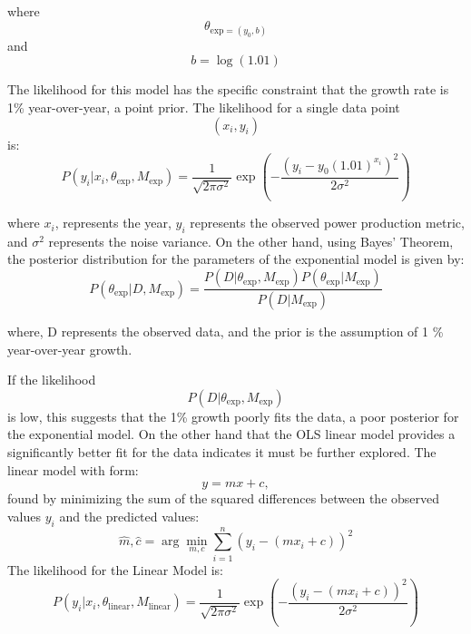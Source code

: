 \documentclass[final,5p,times,twocolumn,authoryear]{elsarticle}
\begin{document}
where $$\theta_{\text{exp}= (y_0,b)}$$ and $$ b= \log(1.01)$$

The likelihood for this model has the specific constraint that the growth rate is 1\% year-over-year, a point prior. The likelihood for a single data point $$(x_{i},y_{i})$$ is: $$P(y_i | x_i, \theta_{\text{exp}}, M_{\text{exp}}) = \frac{1}{\sqrt{2 \pi \sigma^2}} \exp \left( -\frac{(y_i - y_0 (1.01)^{x_i})^2}{2\sigma^2} \right)
$$

where $x_{i}$, represents the year, $y_{i}$ represents the observed power production metric, and $\sigma^{2}$ represents the noise variance. On the other hand, using Bayes' Theorem, the posterior distribution for the parameters of the exponential model is given by:
$$P(\theta_{\text{exp}} | D, M_{\text{exp}}) = \frac{P(D | \theta_{\text{exp}}, M_{\text{exp}}) P(\theta_{\text{exp}} | M_{\text{exp}})}{P(D | M_{\text{exp}})}
$$

where, D represents the observed data, and the prior is the assumption of 1 \% year-over-year growth. 

If the likelihood $$ P(D | \theta_{\text{exp}}, M_{\text{exp}})$$ is low, this suggests that the 1\% growth poorly fits the data, a poor posterior for the exponential model.
 On the other hand that the OLS linear model provides a significantly better fit for the data indicates it must be further explored. The linear model with form: $$y=mx+c,$$ found by minimizing the sum of the squared differences between the observed values $y_{i}$ and the predicted values: $$\hat{m}, \hat{c} = \arg\min_{m, c} \sum_{i=1}^{n} (y_i - (mx_i + c))^2
$$
The likelihood for the Linear Model is:
$$P(y_i | x_i, \theta_{\text{linear}}, M_{\text{linear}}) = \frac{1}{\sqrt{2 \pi \sigma^2}} \exp \left( -\frac{(y_i - (mx_i + c))^2}{2\sigma^2} \right)
$$
\end{document}
